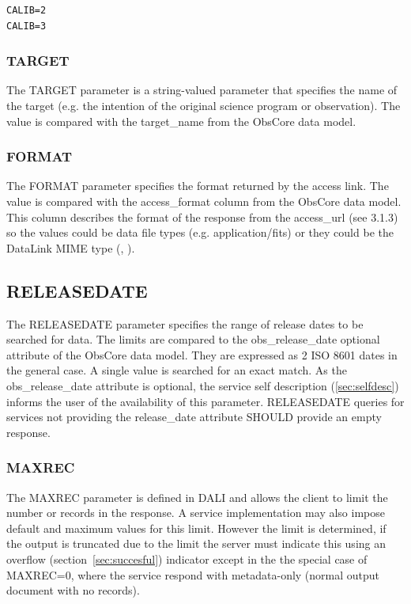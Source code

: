 \documentclass[11pt,a4paper]{ivoa}
\begin{document}
\begin{lstlisting}
CALIB=2
CALIB=3
\end{lstlisting}

\subsubsection{TARGET}
The TARGET parameter is a string-valued parameter that specifies the name of the target (e.g. the intention of the original science program or observation). The value is compared with the target\_name from the ObsCore data model.

\subsubsection{FORMAT}
The FORMAT parameter specifies the  format returned by  the access  link.  The value is compared with the access\_format column from the ObsCore data model. This column describes the format of the response from the access\_url (see 3.1.3) so the values could be data file types (e.g. application/fits) or they could be the DataLink  MIME type (\cite{std:DataLink}, \cite{std:TSV}).  

\subsection{RELEASEDATE}
The RELEASEDATE parameter specifies the range of release dates to be searched for data. 
The limits are compared to the obs\_release\_date optional attribute of the ObsCore data model. 
They are expressed as 2 ISO 8601 dates in the general case. A single value is searched for an exact match.
As the obs\_release\_date attribute is optional, the service self description (\ref{sec:selfdesc})  informs the user of the availability of this parameter.
RELEASEDATE queries for services not providing the release\_date attribute SHOULD provide an empty response.

\subsubsection{MAXREC}
The MAXREC parameter is defined in DALI and allows the client to limit the number or records in the response. A service implementation may also impose default and maximum values for this limit. However the limit is determined, if the output is truncated due to the limit the server must indicate this using an overflow  (section~\ref{sec:succesful}) indicator except in the the special case of MAXREC=0, where the  service respond with metadata-only (normal output document with no records).
\end{document}
